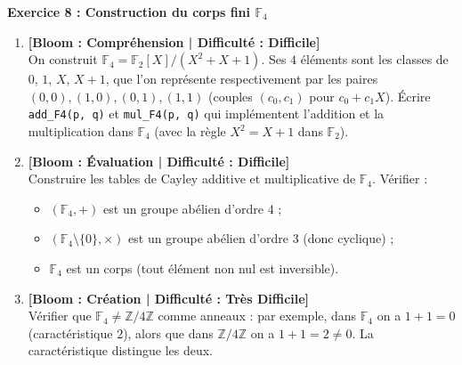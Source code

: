 \documentclass[12pt,a4paper]{report}
\theoremstyle{definition}
\theoremstyle{remark}
\begin{document}
\noindent\textbf{Exercice 8 : Construction du corps fini $\mathbb{F}_4$}
\begin{enumerate}
    \item \textbf{[Bloom : Compréhension | Difficulté : Difficile]} \\
    On construit $\mathbb{F}_4 = \mathbb{F}_2[X] / (X^2 + X + 1)$. Ses $4$ éléments sont les classes de $0$, $1$, $X$, $X + 1$, que l'on représente respectivement par les paires $(0, 0), (1, 0), (0, 1), (1, 1)$ (couples $(c_0, c_1)$ pour $c_0 + c_1 X$).
    Écrire \texttt{add\_F4(p, q)} et \texttt{mul\_F4(p, q)} qui implémentent l'addition et la multiplication dans $\mathbb{F}_4$ (avec la règle $X^2 = X + 1$ dans $\mathbb{F}_2$).
    \item \textbf{[Bloom : Évaluation | Difficulté : Difficile]} \\
    Construire les tables de Cayley additive et multiplicative de $\mathbb{F}_4$. Vérifier :
    \begin{itemize}
        \item $(\mathbb{F}_4, +)$ est un groupe abélien d'ordre $4$ ;
        \item $(\mathbb{F}_4 \setminus \{0\}, \times)$ est un groupe abélien d'ordre $3$ (donc cyclique) ;
        \item $\mathbb{F}_4$ est un corps (tout élément non nul est inversible).
    \end{itemize}
    \item \textbf{[Bloom : Création | Difficulté : Très Difficile]} \\
    Vérifier que $\mathbb{F}_4 \neq \mathbb{Z}/4\mathbb{Z}$ comme anneaux : par exemple, dans $\mathbb{F}_4$ on a $1 + 1 = 0$ (caractéristique $2$), alors que dans $\mathbb{Z}/4\mathbb{Z}$ on a $1 + 1 = 2 \neq 0$. La caractéristique distingue les deux.
\end{enumerate}
\end{document}
